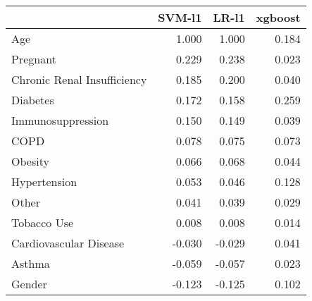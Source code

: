 \begin{tabular}{lrrr}
\toprule
{} &  SVM-l1 &  LR-l1 &  xgboost \\
\midrule
Age                         &   1.000 &  1.000 &    0.184 \\
Pregnant                    &   0.229 &  0.238 &    0.023 \\
Chronic Renal Insufficiency &   0.185 &  0.200 &    0.040 \\
Diabetes                    &   0.172 &  0.158 &    0.259 \\
Immunosuppression           &   0.150 &  0.149 &    0.039 \\
COPD                        &   0.078 &  0.075 &    0.073 \\
Obesity                     &   0.066 &  0.068 &    0.044 \\
Hypertension                &   0.053 &  0.046 &    0.128 \\
Other                       &   0.041 &  0.039 &    0.029 \\
Tobacco Use                 &   0.008 &  0.008 &    0.014 \\
Cardiovascular Disease      &  -0.030 & -0.029 &    0.041 \\
Asthma                      &  -0.059 & -0.057 &    0.023 \\
Gender                      &  -0.123 & -0.125 &    0.102 \\
\bottomrule
\end{tabular}

